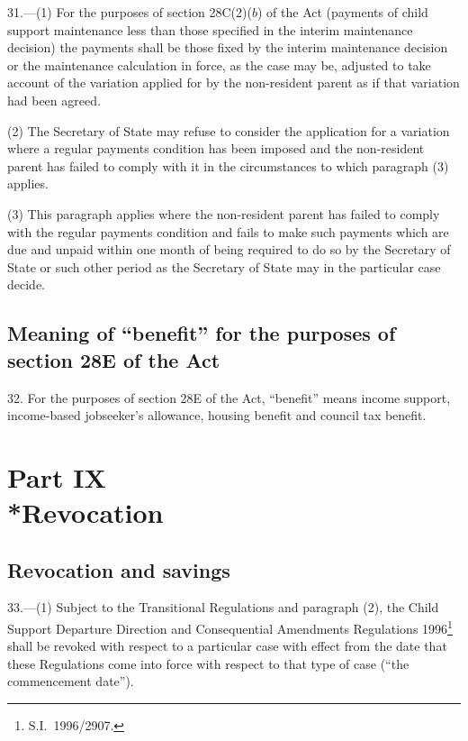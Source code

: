 \documentclass[12pt,a4paper]{article}
\begin{document}
\renewcommand\parthead{--- Part VIII}

31.---(1)  For the purposes of section 28C(2)($b$)  of the Act (payments of child support maintenance less than those specified in the interim maintenance decision) the payments shall be those fixed by the interim maintenance decision or the maintenance calculation in force, as the case may be, adjusted to take account of the variation applied for by the non-resident parent as if that variation had been agreed.

(2) The Secretary of State may refuse to consider the application for a variation where a regular payments condition has been imposed and the non-resident parent has failed to comply with it in the circumstances to which paragraph (3) applies.

(3) This paragraph applies where the non-resident parent has failed to comply with the regular payments condition and fails to make such payments which are due and unpaid within one month of being required to do so by the Secretary of State or such other period as the Secretary of State may in the particular case decide.

\subsection[32. Meaning of “benefit” for the purposes of section 28E of the Act]{Meaning of “benefit” for the purposes of section 28E of the Act}

32.  For the purposes of section 28E of the Act, “benefit” means income support, income-based jobseeker’s allowance, housing benefit and council tax benefit.

\section[Part IX --- Revocation]{Part IX\\*Revocation}

\renewcommand\parthead{--- Part IX}

\subsection[33. Revocation and savings]{Revocation and savings}

33.---(1)  Subject to 
the Transitional Regulations and  %
paragraph (2), the Child Support Departure Direction and Consequential Amendments Regulations 1996\footnote{S.I.\ 1996/2907.} shall be revoked with respect to a particular case with effect from the date that these Regulations come into force with respect to that type of case (“the commencement date”).
\end{document}

